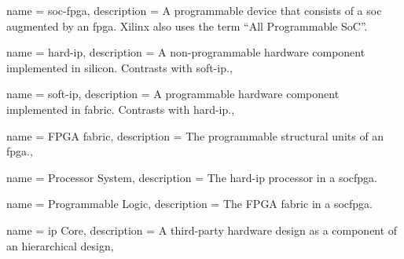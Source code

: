 {
	name = {\acrshort{soc}-\acrshort{fpga}},
	description = {A programmable device that consists of a \acrlong{soc} augmented by an \acrlong{fpga}.
		Xilinx also uses the term ``All Programmable SoC''.}
}

{
	name = {hard-\acrshort{ip}},
	description = {A non-programmable hardware component implemented in silicon.
		Contrasts with \gls{soft-ip}.},
}

{
	name = {soft-\acrshort{ip}},
	description = {A programmable hardware component implemented in \gls{fabric}.
		Contrasts with \gls{hard-ip}.},
}

{
	name = {FPGA fabric},
	description = {The programmable structural units of an \acrshort{fpga}.},
}

{
	name = {Processor System},
	description = {The \acrshort{hard-ip} processor in a \gls{socfpga}.}
}

{
	name = {Programmable Logic},
	description = {The FPGA \gls{fabric} in a \gls{socfpga}.}
}

{
	name = {\acrshort{ip} Core},
	description = {A third-party hardware design as a component of an hierarchical design},
}
